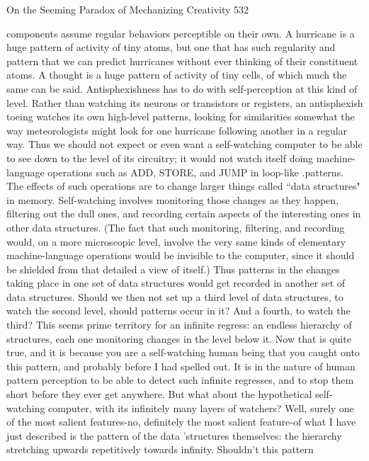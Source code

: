 On the Seeming Paradox of Mechanizing Creativity                                       532

components assume regular behaviors perceptible on their own. A hurricane is a huge
pattern of activity of tiny atoms, but one that has such regularity and pattern that we
can predict hurricanes without ever thinking of their constituent atoms. A thought is a
huge pattern of activity of tiny cells, of which much the same can be said.
        Antisphexishness has to do with self-perception at this kind of level. Rather
than watching its neurons or transistors or registers, an antisphexish toeing watches its
own high-level patterns, looking for similarities somewhat the way meteorologists
might look for one hurricane following another in a regular way.
        Thus we should not expect or even want a self-watching computer to be able
to see down to the level of its circuitry; it would not watch itself doing machine-
language operations such as ADD, STORE, and JUMP in loop-like .patterns. The
effects of such operations are to change larger things called “data structures" in
memory. Self-watching involves monitoring those changes as they happen, filtering
out the dull ones, and recording certain aspects of the interesting ones in other data
structures. (The fact that such monitoring, filtering, and recording would, on a more
microscopic level, involve the very same kinds of elementary machine-language
operations would be invisible to the computer, since it should be shielded from that
detailed a view of itself.) Thus patterns in the changes taking place in one set of data
structures would get recorded in another set of data structures. Should we then not set
up a third level of data structures, to watch the second level, should patterns occur in
it? And a fourth, to watch the third? This seems prime territory for an infinite regress:
an endless hierarchy of structures, each one monitoring changes in the level below it.
        Now that is quite true, and it is because you are a self-watching human being
that you caught onto this pattern, and probably before I had spelled out. It is in the
nature of human pattern perception to be able to detect such infinite regresses, and to
stop them short before they ever get anywhere. But what about the hypothetical self-
watching computer, with its infinitely many layers of watchers?
        Well, surely one of the most salient features-no, definitely the most salient
feature-of what I have just described is the pattern of the data 'structures themselves:
the hierarchy stretching upwards repetitively towards infinity. Shouldn't this pattern
